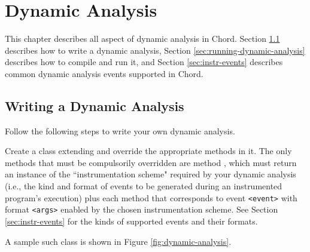 \chapter{Dynamic Analysis}
\label{chap:dynamic-analysis}

This chapter describes all aspect of dynamic analysis in Chord.
Section \ref{sec:writing-dynamic-analysis} describes how to write a dynamic analysis,
Section \ref{sec:running-dynamic-analysis} describes how to compile and run it,
and Section \ref{sec:instr-events} describes common dynamic analysis events
supported in Chord.

\section{Writing a Dynamic Analysis}
\label{sec:writing-dynamic-analysis}

Follow the following steps to write your own dynamic analysis.

Create a class extending  and override
the appropriate methods in it.
The only methods that must be compulsorily overridden are method ,
which must return an instance of the ``instrumentation scheme" required by
your dynamic analysis (i.e., the kind and format of events to be generated during an
instrumented program's execution)
plus each  method that corresponds to event {\tt <event>}
with format {\tt <args>} enabled by the chosen instrumentation scheme.
See Section \ref{sec:instr-events} for the kinds of supported events and their formats.

A sample such class  is shown in Figure \ref{fig:dynamic-analysis}.

